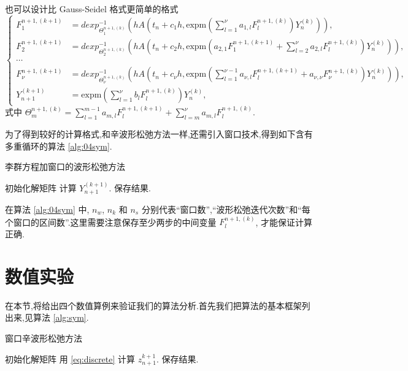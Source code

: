 也可以设计比 Gauss-Seidel 格式更简单的格式
\begin{equation*}
	\left\lbrace\begin{aligned}
		F_1^{n+1,(k+1)}&=dexp_{\Theta_1^{n+1,(k)}}^{-1}(hA(t_n+c_1h,\mbox{expm}(\sum_{l=1}^{\nu}a_{1,l}F_l^{n+1,(k)})Y_n^{(k)})),\\
		F_2^{n+1,(k+1)}&=dexp_{\Theta_2^{n+1,(k)}}^{-1}(hA(t_n+c_2h,\mbox{expm}(a_{2,1}F_1^{n+1,(k+1)}+\sum_{l=2}^{\nu}a_{2,l}F_l^{n+1,(k)})Y_n^{(k)})),\\
		\cdots \\
		F_{\nu}^{n+1,(k+1)}&=dexp_{\Theta_{\nu}^{n+1,(k)}}^{-1}(hA(t_n+c_{\nu}h,\mbox{expm}(\sum_{l=1}^{\nu-1}a_{\nu,l}F_{l}^{n+1,(k+1)}+a_{\nu,\nu}F_{\nu}^{n+1,(k)})Y_n^{(k)})),\\
		Y_{n+1}^{(k+1)}&=\mbox{expm}(\sum_{l=1}^{\nu}b_lF_l^{n+1,(k)})Y_n^{(k)},
	\end{aligned}\right.
\end{equation*}
式中 $\Theta_m^{n+1,(k)} = \sum_{l=1}^{m-1}a_{m,l}F_{l}^{n+1,(k+1)}+\sum_{l=m}^{\nu}a_{m,l}F_l^{n+1,(k)}$.

为了得到较好的计算格式,和辛波形松弛方法一样,还需引入窗口技术,得到如下含有多重循环的算法 \ref{alg:04sym}.

\begin{algorithm}
\caption{李群方程加窗口的波形松弛方法}
\label{alg:04sym}
\begin{algorithmic}
\STATE 初始化解矩阵
             \STATE 计算 $Y_{n+1}^{(k+1)}$.
        \ENDFOR
    \ENDFOR
\ENDFOR
\STATE 保存结果.
\end{algorithmic}
\end{algorithm}
在算法 \ref{alg:04sym} 中, $n_w$, $n_k$ 和 $n_s$ 分别代表``窗口数'',``波形松弛迭代次数''和``每个窗口的区间数''.这里需要注意保存至少两步的中间变量 $F_l^{n+1,(k)}$, 才能保证计算正确.

\section{数值实验}\label{sec:03numerical}
在本节,将给出四个数值算例来验证我们的算法分析.首先我们把算法的基本框架列出来,见算法 \ref{alg:sym}.

\begin{algorithm}
\caption{窗口辛波形松弛方法}
\label{alg:sym}
\begin{algorithmic}
\STATE 初始化解矩阵
             \STATE 用 \eqref{eq:discrete} 计算 $z_{n+1}^{k+1}$.
        \ENDFOR
    \ENDFOR
\ENDFOR
\STATE 保存结果.
\end{algorithmic}
\end{algorithm}

